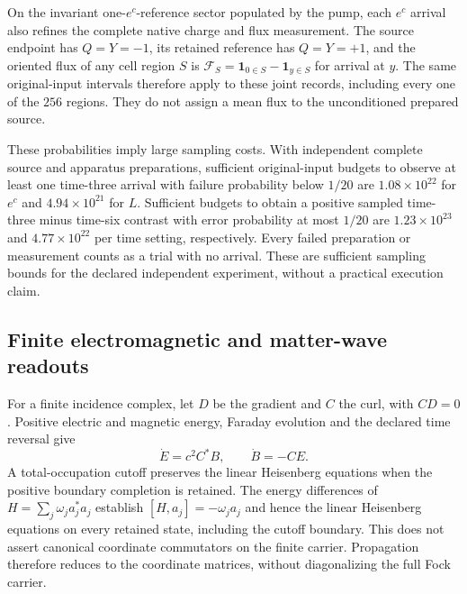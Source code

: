 On the invariant one-$e^c$-reference sector populated by the pump, each
$e^c$ arrival also refines the complete native charge and flux
measurement. The source endpoint has $Q=Y=-1$, its retained reference
has $Q=Y=+1$, and the oriented flux of any cell region $S$ is
$\mathcal F_S=\mathbf1_{0\in S}-\mathbf1_{y\in S}$ for arrival at $y$.
The same original-input intervals therefore apply to these joint records,
including every one of the $256$ regions. They do not assign a mean flux
to the unconditioned prepared source.

These probabilities imply large sampling costs. With independent complete
source and apparatus preparations, sufficient original-input budgets to
observe at least one time-three arrival with failure probability below
$1/20$ are $1.08\times10^{22}$ for $e^c$ and
$4.94\times10^{21}$ for $L$. Sufficient budgets to obtain a positive
sampled time-three minus time-six contrast with error probability at most
$1/20$ are $1.23\times10^{23}$ and $4.77\times10^{22}$ per time setting,
respectively. Every failed preparation or measurement counts as a trial
with no arrival. These are sufficient sampling bounds for the declared
independent experiment, without a practical execution claim.

\subsection{Finite electromagnetic and matter-wave readouts}

For a finite incidence complex, let $D$ be the gradient and $C$ the curl, with $CD=0$. Positive electric and magnetic energy, Faraday evolution and the declared time reversal give
\[
 \dot E=c^2C^*B,\qquad \dot B=-CE.
\]
A total-occupation cutoff preserves the linear Heisenberg equations when the positive boundary completion is retained. The energy differences of $H=\sum_j\omega_j a_j^*a_j$ establish $[H,a_j]=-\omega_j a_j$ and hence the linear Heisenberg equations on every retained state, including the cutoff boundary. This does not assert canonical coordinate commutators on the finite carrier. Propagation therefore reduces to the coordinate matrices, without diagonalizing the full Fock carrier.

